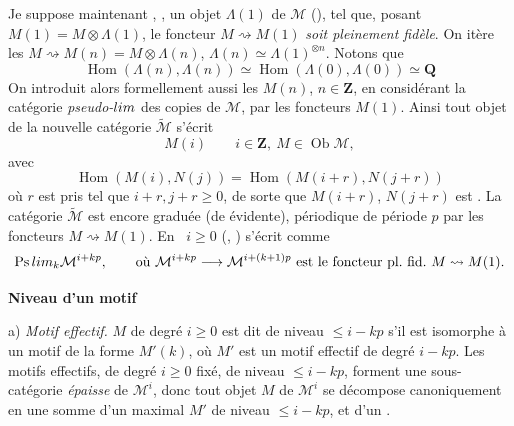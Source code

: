 \documentclass[11pt,a4paper]{article}
\begin{document}
\struck{\ill{}} Je suppose maintenant , 
, un objet \struck{\ill{}} $\Lambda(1)$ de $\mathcal{M}$
(), tel que, posant \struck{\ill{}}
$M(1) = M \otimes \Lambda(1)$, \struck{\ill{} \ill{}} le
foncteur $M \rightsquigarrow M(1)$ \emph{soit pleinement fidèle}. On itère
 les $M \rightsquigarrow M(n) = M \otimes \Lambda(n)$,
$\Lambda(n) \simeq \Lambda(1)^{\otimes n}$. Notons que
\[
  \operatorname{Hom}(\Lambda(n), \Lambda(n)) \simeq
  \operatorname{Hom}(\Lambda(0), \Lambda(0)) \simeq \mathbf{Q}
\]
On introduit alors formellement aussi les $M(n)$, $n \in \mathbf{Z}$, en
considérant la catégorie \emph{pseudo-$\varinjlim$} des copies de
$\mathcal{M}$, par les foncteurs $M(1)$. Ainsi tout objet de la nouvelle
catégorie $\widetilde{\mathcal{M}}$  s'écrit
\[
  M(i) \qquad i \in \mathbf{Z},\ M \in \operatorname{Ob}\mathcal{M},
\]
avec
\[
  \operatorname{Hom}(M(i), N(j)) = \operatorname{Hom}(M(i+r), N(j+r))
\]
où $r$ est pris tel que $i+r, j+r \geq 0$, de sorte que $M(i+r)$, $N(j+r)$ est
  . La catégorie
$\widetilde{\mathcal{M}}$ est encore graduée (de  évidente),
 périodique de période $p$ par les foncteurs
$M \rightsquigarrow M(1)$. En \ $i \geq 0$ (, \ill{} \ill{} )  \ill{} s'écrit
comme
\[
  \operatorname{Ps}\varinjlim_{k} \mathcal{M}^{i+kp}, \qquad
  \text{où } \mathcal{M}^{i+kp} \longrightarrow \mathcal{M}^{i+(k+1)p}
  \text{ est le foncteur pl.\ fid.\ } M \rightsquigarrow M(1).
\]


\textbf{Niveau d'un motif}

a) \emph{Motif effectif.} $M$ de degré $i \geq 0$ est dit de niveau
$\leq i - kp$ s'il est isomorphe à un \struck{\ill{}} motif de la forme
$M'(k)$, où $M'$ est un motif effectif de degré $i - kp$.
Les motifs effectifs, de degré $i \geq 0$ fixé, de niveau $\leq i - kp$, forment
une sous-catégorie \emph{épaisse} de $\mathcal{M}^{i}$, donc tout objet $M$ de
$\mathcal{M}^{i}$ se décompose canoniquement en une somme d'un
 maximal \uncertain{(\ill{})}
$M'$ de niveau $\leq i - kp$, et d'un  
\ill{}.
\end{document}
